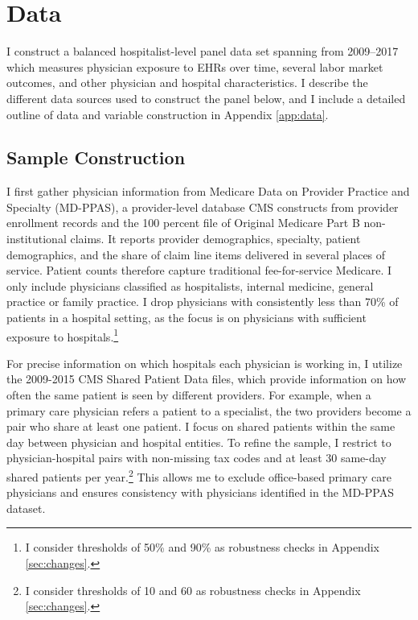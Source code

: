 \documentclass[12pt]{article}
\begin{document}
\section{Data}\label{sec:data}

I construct a balanced hospitalist-level panel data set spanning from 2009--2017 which measures physician exposure to EHRs over time, several labor market outcomes, and other physician and hospital characteristics. I describe the different data sources used to construct the panel below, and I include a detailed outline of data and variable construction in Appendix \ref{app:data}.

\subsection{Sample Construction}\label{sec:sample}

I first gather physician information from Medicare Data on Provider Practice and Specialty (MD-PPAS), a provider-level database CMS constructs from provider enrollment records and the 100 percent file of Original Medicare Part B non-institutional claims. It reports provider demographics, specialty, patient demographics, and the share of claim line items delivered in several places of service. Patient counts therefore capture traditional fee-for-service Medicare. I only include physicians classified as hospitalists, internal medicine, general practice or family practice. I drop physicians with consistently less than 70\% of patients in a hospital setting, as the focus is on physicians with sufficient exposure to hospitals.\footnote{I consider thresholds of 50\% and 90\% as robustness checks in Appendix \ref{sec:changes}.}

For precise information on which hospitals each physician is working in, I utilize the 2009-2015 CMS Shared Patient Data files, which provide information on how often the same patient is seen by different providers. For example, when a primary care physician refers a patient to a specialist, the two providers become a pair who share at least one patient. I focus on shared patients within the same day between physician and hospital entities. To refine the sample, I restrict to physician-hospital pairs with non-missing tax codes and at least 30 same-day shared patients per year.\footnote{I consider thresholds of 10 and 60 as robustness checks in Appendix \ref{sec:changes}.} This allows me to exclude office-based primary care physicians and ensures consistency with physicians identified in the MD-PPAS dataset. 
\end{document}
